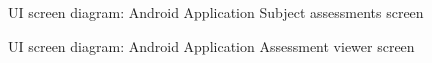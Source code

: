 \begin{figure}[H]
\centering	
{}
\caption{UI screen diagram: Android Application Subject assessments screen}
\end{figure}

\begin{figure}[H]
\centering	
{}
\caption{UI screen diagram: Android Application Assessment viewer screen}
\end{figure}